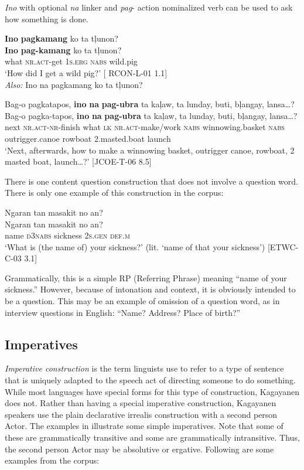 \textit{Ino} with optional \textit{na} linker and \textit{pag}{}- action nominalized verb can be used to ask how something is done.

\ea
\textbf{Ino}  \textbf{pagkamang}  ko  ta  tļunon? \\\smallskip
\gll \textbf{Ino}  \textbf{pag-kamang}  ko  ta  tļunon? \\
what  \textsc{nr.act}-get  1\textsc{s.erg}  \textsc{nabs}  wild.pig \\
\glt ‘How did I get a wild pig?' [ RCON-L-01 1.1] \\\smallskip
\textit{Also:} Ino na pagkamang ko ta tļunon?
\z

\ea
Bag-o  pagkatapos,  \textbf{ino}  \textbf{na}  \textbf{pag-ubra}  ta  kaļaw, ta  lunday,  buti,  bļangay,  lansa…? \\\smallskip
\gll Bag-o  pagka-tapos,  \textbf{ino}  \textbf{na}  \textbf{pag-ubra}  ta  kaļaw, ta  lunday,  buti,  bļangay,  lansa…? \\
next  \textsc{nr.act-nr}-finish  what  \textsc{lk}  \textsc{nr.act}-make/work  \textsc{nabs}  winnowing.basket
\textsc{nabs} outrigger.canoe  rowboat  2.masted.boat  launch \\
\glt `Next, afterwards, how to make a winnowing basket, outrigger canoe, rowboat, 2 masted boat, launch…?’ [JCOE-T-06 8.5]
\z

There is one content question construction that does not involve a question word. There is only one example of this construction in the corpus:

\ea
Ngaran  tan  masakit  no  an? \\\smallskip
\gll Ngaran  tan  masakit  no  an? \\
name  \textsc{d3nabs}  sickness  2\textsc{s.gen}  \textsc{def.m} \\
\glt ‘What is (the name of) your sickness?’ (lit. ‘name of that your sickness’) [ETWC-C-03 3.1]
\z

Grammatically, this is a simple RP (Referring Phrase) meaning “name of your sickness.” However, because of intonation and context, it is obviously intended to be a question. This may be an example of omission of a question word, as in interview questions in English: “Name? Address? Place of birth?”

\subsection{Imperatives} 
\label{bkm:Ref445900361}
\textit{Imperative construction} is the term linguists use to refer to a type of sentence that is uniquely adapted to the speech act of directing someone to do something. While most languages have special forms for this type of construction, Kagayanen does not. Rather than having a special imperative construction, Kagayanen speakers use the plain declarative irrealis construction with a second person Actor. The examples in  illustrate some simple imperatives. Note that some of these are grammatically transitive and some are grammatically intransitive. Thus, the second person Actor may be absolutive or ergative. Following  are some examples from the corpus:


